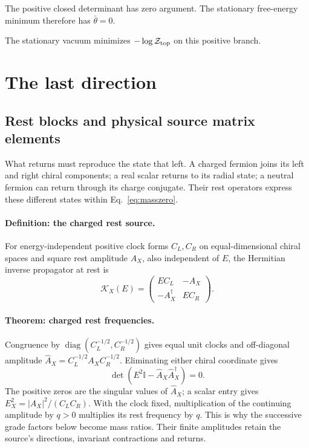 \documentclass[aps,prx,onecolumn,10pt,notitlepage,nofootinbib,longbibliography]{revtex4-2}
\numberwithin{equation}{section}
\numberwithin{table}{section}
\newcommand{\Id}{\mathbb I}
\newcommand{\diag}{\operatorname{diag}}
\begin{document}
The positive closed determinant has zero argument. The stationary free-energy minimum therefore has $\bar\theta=0$.

The stationary vacuum minimizes $-\log\mathcal Z_{\rm top}$ on this positive branch.

\section{The last direction}
\label{sec:step-seven}

\subsection{Rest blocks and physical source matrix elements}
What returns must reproduce the state that left. A charged fermion joins its left and right chiral components; a real scalar returns to its radial state; a neutral fermion can return through its charge conjugate. Their rest operators express these different states within Eq.~\eqref{eq:masszero}.

\paragraph*{Definition: the charged rest source.}
For energy-independent positive clock forms $C_L,C_R$ on equal-dimensional chiral spaces and square rest amplitude $A_X$, also independent of $E$, the Hermitian inverse propagator at rest is
\begin{equation}
 \mathcal K_X(E)=\begin{pmatrix}EC_L&-A_X\\-A_X^\dagger&EC_R\end{pmatrix}.
 \label{eq:restpencil}
\end{equation}
\paragraph*{Theorem: charged rest frequencies.}
Congruence by $\diag(C_L^{-1/2},C_R^{-1/2})$ gives equal unit clocks and off-diagonal amplitude $\widehat A_X=C_L^{-1/2}A_XC_R^{-1/2}$. Eliminating either chiral coordinate gives
\begin{equation}
 \det(E^2\Id-\widehat A_X\widehat A_X^\dagger)=0.
 \label{eq:chargednecessity}
\end{equation}
The positive zeros are the singular values of $\widehat A_X$; a scalar entry gives $E_X^2=|A_X|^2/(C_LC_R)$. With the clock fixed, multiplication of the continuing amplitude by $q>0$ multiplies its rest frequency by $q$. This is why the successive grade factors below become mass ratios. Their finite amplitudes retain the source's directions, invariant contractions and returns.
\end{document}
